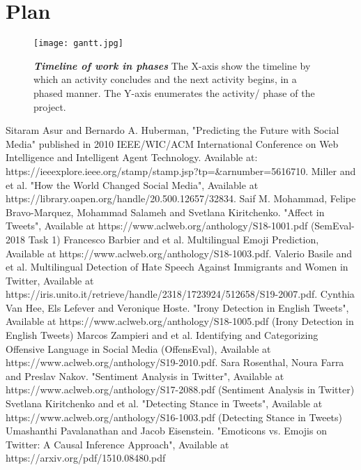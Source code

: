 \documentclass[a4paper]{article}
\begin{document}
\section{Plan}
\begin{figure}[h!]
\centering
\texttt{[image: gantt.jpg]}
\caption{\label{fig:frog}{\textbf{\textit{Timeline of work in phases}}\textit{}} The X-axis show the timeline by which an activity concludes and the next activity begins, in a phased manner. The Y-axis enumerates the activity/ phase of the project.}
\end{figure}
\begin{thebibliography}{00}
 Sitaram Asur and Bernardo A. Huberman, "Predicting the Future with Social Media" published in  2010 IEEE/WIC/ACM International Conference on Web Intelligence and Intelligent Agent Technology. Available at: https://ieeexplore.ieee.org/stamp/stamp.jsp?tp=&arnumber=5616710.
 Miller and et al. "How the World Changed Social Media", Available at https://library.oapen.org/handle/20.500.12657/32834.
 Saif M. Mohammad, Felipe Bravo-Marquez, Mohammad Salameh and Svetlana Kiritchenko. "Affect in Tweets", Available at https://www.aclweb.org/anthology/S18-1001.pdf (SemEval-2018 Task 1)
 Francesco Barbier and et al. Multilingual Emoji Prediction, Available at https://www.aclweb.org/anthology/S18-1003.pdf.
 Valerio Basile and et al. Multilingual Detection of Hate Speech Against Immigrants and Women in Twitter, Available at https://iris.unito.it/retrieve/handle/2318/1723924/512658/S19-2007.pdf.
 Cynthia Van Hee, Els Lefever and Veronique Hoste. "Irony Detection in English Tweets", Available at https://www.aclweb.org/anthology/S18-1005.pdf (Irony Detection in English Tweets)
 Marcos Zampieri and et al. Identifying and Categorizing Offensive Language in Social Media (OffensEval), Available at https://www.aclweb.org/anthology/S19-2010.pdf.
 Sara Rosenthal, Noura Farra and Preslav Nakov. "Sentiment Analysis in Twitter", Available at https://www.aclweb.org/anthology/S17-2088.pdf (Sentiment Analysis in Twitter)
 Svetlana Kiritchenko and et al. "Detecting Stance in Tweets", Available at https://www.aclweb.org/anthology/S16-1003.pdf (Detecting Stance in Tweets) 
 Umashanthi Pavalanathan and Jacob Eisenstein. "Emoticons vs. Emojis on Twitter: A Causal Inference Approach", Available at https://arxiv.org/pdf/1510.08480.pdf
\end{thebibliography}
\end{document}
